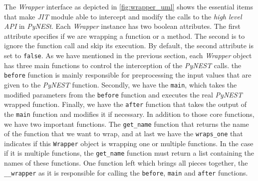 The \emph{Wrapper} interface as depicted in \autoref{fig:wrapper_uml} shows the essential items that make \emph{JIT} module able to intercept and modify the calls to the \emph{high level API} in \emph{PyNESt}. Each \emph{Wrapper} instance has two boolean attributes. The first attribute specifies if we are wrapping a function or a method. The second is to ignore the function call and skip its execution. By default, the second attribute is set to \texttt{false}. As we have mentioned in the previous section, each \emph{Wrapper} object has three main functions to control the interception of the \emph{PyNEST} calls. the \texttt{before} function is mainly responsible for preprocessing the input values that are given to the \emph{PyNEST} function. Secondly, we have the \texttt{main}, which takes the modified parameters from the \texttt{before} function and executes the real \emph{PyNEST} wrapped function. Finally, we have the \texttt{after} function that takes the output of the \texttt{main} function and modifies it if necessary. In addition to those core functions, we have two important functions. The \texttt{get\_name} function that returns the name of the function that we want to wrap, and at last we have the \texttt{wraps\_one} that indicates if this \texttt{Wrapper} object is wrapping one or multiple functions. In the case if it is multiple functions, the \texttt{get\_name} function must return a list containing the names of these functions. One function left which brings all pieces together, the \texttt{\_\_wrapper} as it is responsible for calling the \texttt{before}, \texttt{main} and \texttt{after} functions.


